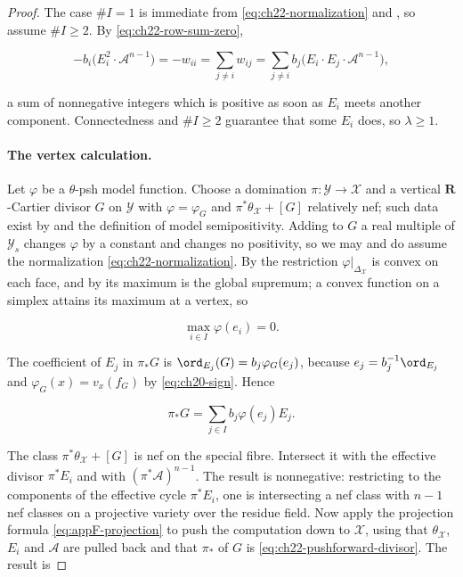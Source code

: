 \begin{proof}
The case $\#I=1$ is immediate from
\eqref{eq:ch22-normalization} and
, so assume $\#I\geq2$.  By
\eqref{eq:ch22-row-sum-zero},

\[
 -b_i\bigl(E_i^2\cdot\mathcal A^{n-1}\bigr)
 =-w_{ii}
 =\sum_{j\neq i}w_{ij}
 =\sum_{j\neq i}b_j\bigl(E_i\cdot E_j\cdot\mathcal A^{n-1}\bigr),
\]

a sum of nonnegative integers which is positive as soon as $E_i$ meets
another component.  Connectedness and $\#I\geq2$ guarantee that some $E_i$ does,
so $\lambda\geq1$.

\paragraph{The vertex calculation.}
Let $\varphi$ be a $\theta$-psh model function.  Choose a domination
$\pi:\mathcal Y\to\mathcal X$ and a vertical $\mathbf R$-Cartier divisor
$G$ on $\mathcal Y$ with $\varphi=\varphi_G$ and
$\pi^*\theta_{\mathcal X}+[G]$ relatively nef; such data exist by
 and the definition of model
semipositivity.  Adding to $G$ a real multiple of $\mathcal Y_s$ changes
$\varphi$ by a constant and changes no positivity, so we may and do assume
the normalization \eqref{eq:ch22-normalization}.  By
 the restriction
$\varphi|_{\Delta_{\mathcal X}}$ is convex on each face, and by
 its maximum is the global supremum; a
convex function on a simplex attains its maximum at a vertex, so

\[
                         \max_{i\in I}\varphi(e_i)=0 .
\tag{22.26}\label{eq:ch22-vertex-max}
\]

The coefficient of $E_j$ in $\pi_*G$ is
$\ord_{E_j}(G)=b_j\varphi_G(e_j)$, because
$e_j=b_j^{-1}\ord_{E_j}$ and $\varphi_G(x)=v_x(f_G)$ by
\eqref{eq:ch20-sign}.  Hence

\[
             \pi_*G=\sum_{j\in I}b_j\varphi(e_j)E_j.
\tag{22.27}\label{eq:ch22-pushforward-divisor}
\]

The class $\pi^*\theta_{\mathcal X}+[G]$ is nef on the special fibre.
Intersect it with the effective divisor $\pi^*E_i$ and with
$(\pi^*\mathcal A)^{n-1}$.  The result is nonnegative: restricting to the
components of the effective cycle $\pi^*E_i$, one is intersecting a nef
class with $n-1$ nef classes on a projective variety over the residue
field.  Now apply the projection formula
\eqref{eq:appF-projection} to push the computation down to $\mathcal X$,
using that $\theta_{\mathcal X}$, $E_i$ and $\mathcal A$ are pulled
back and that $\pi_*$ of $G$ is \eqref{eq:ch22-pushforward-divisor}.
The result is


\end{proof}

